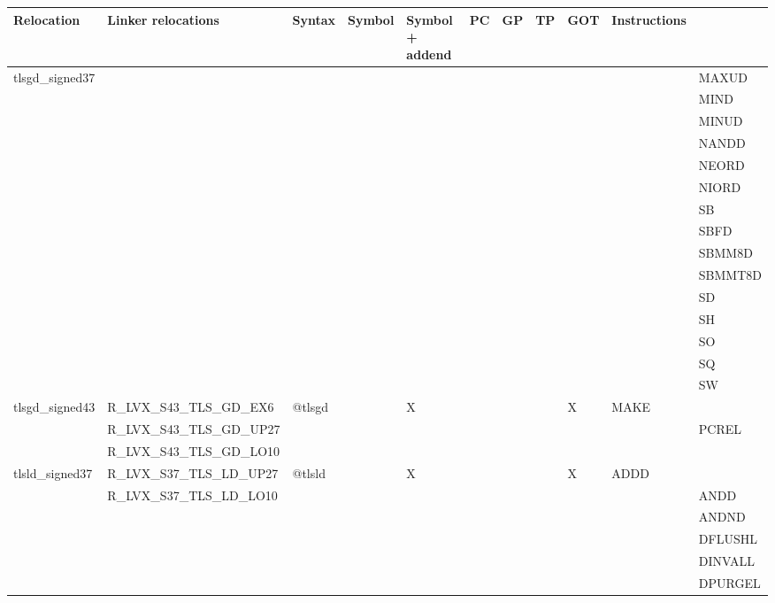 {\tiny
\begin{tabular}{|l|l|l|l|l|l|l|l|l|l|l|} \hline
\textsf{Relocation} & \textsf{Linker relocations} & \textsf{Syntax} & \textsf{Symbol} & \textsf{Symbol + addend} & \textsf{PC} & \textsf{GP} & \textsf{TP} & \textsf{GOT} & \textsf{Instructions} \\
\hline
\textsf{tlsgd\_signed37} & & & & & & & & & & \textsf{MAXUD} \\
 & & & & & & & & & & \textsf{MIND} \\
 & & & & & & & & & & \textsf{MINUD} \\
 & & & & & & & & & & \textsf{NANDD} \\
 & & & & & & & & & & \textsf{NEORD} \\
 & & & & & & & & & & \textsf{NIORD} \\
 & & & & & & & & & & \textsf{SB} \\
 & & & & & & & & & & \textsf{SBFD} \\
 & & & & & & & & & & \textsf{SBMM8D} \\
 & & & & & & & & & & \textsf{SBMMT8D} \\
 & & & & & & & & & & \textsf{SD} \\
 & & & & & & & & & & \textsf{SH} \\
 & & & & & & & & & & \textsf{SO} \\
 & & & & & & & & & & \textsf{SQ} \\
 & & & & & & & & & & \textsf{SW} \\
\hline
\textsf{tlsgd\_signed43} & \textsf{R\_LVX\_S43\_TLS\_GD\_EX6} & \textsf{@tlsgd} & \textsf{} & \textsf{X} & \textsf{} & \textsf{} & \textsf{} & \textsf{X} & \textsf{MAKE} \\
 & \textsf{R\_LVX\_S43\_TLS\_GD\_UP27} & & & & & & & & & \textsf{PCREL} \\
 & \textsf{R\_LVX\_S43\_TLS\_GD\_LO10} & & & & & & & & & \\
\hline
\textsf{tlsld\_signed37} & \textsf{R\_LVX\_S37\_TLS\_LD\_UP27} & \textsf{@tlsld} & \textsf{} & \textsf{X} & \textsf{} & \textsf{} & \textsf{} & \textsf{X} & \textsf{ADDD} \\
 & \textsf{R\_LVX\_S37\_TLS\_LD\_LO10} & & & & & & & & & \textsf{ANDD} \\
 & & & & & & & & & & \textsf{ANDND} \\
 & & & & & & & & & & \textsf{DFLUSHL} \\
 & & & & & & & & & & \textsf{DINVALL} \\
 & & & & & & & & & & \textsf{DPURGEL} \\

\end{tabular}}
